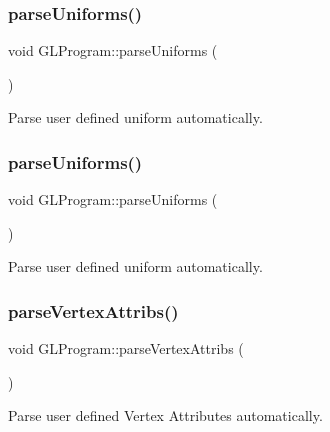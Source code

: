 \subsubsection{\texorpdfstring{parse\+Uniforms()}{parseUniforms()}\hspace{0.1cm}{\footnotesize\ttfamily [1/2]}}
{\footnotesize\ttfamily void G\+L\+Program\+::parse\+Uniforms (\begin{DoxyParamCaption}{ }\end{DoxyParamCaption})\hspace{0.3cm}{\ttfamily [protected]}}

Parse user defined uniform automatically. \mbox{\label{classGLProgram_a669045a0ee3604d6bab1814c2e8a34b6}} 
\subsubsection{\texorpdfstring{parse\+Uniforms()}{parseUniforms()}\hspace{0.1cm}{\footnotesize\ttfamily [2/2]}}
{\footnotesize\ttfamily void G\+L\+Program\+::parse\+Uniforms (\begin{DoxyParamCaption}{ }\end{DoxyParamCaption})\hspace{0.3cm}{\ttfamily [protected]}}

Parse user defined uniform automatically. \mbox{\label{classGLProgram_a579486bb22e5676459aff2b155eb0c0b}} 
\subsubsection{\texorpdfstring{parse\+Vertex\+Attribs()}{parseVertexAttribs()}\hspace{0.1cm}{\footnotesize\ttfamily [1/2]}}
{\footnotesize\ttfamily void G\+L\+Program\+::parse\+Vertex\+Attribs (\begin{DoxyParamCaption}{ }\end{DoxyParamCaption})\hspace{0.3cm}{\ttfamily [protected]}}

Parse user defined Vertex Attributes automatically. \mbox{\label{classGLProgram_a579486bb22e5676459aff2b155eb0c0b}} 
